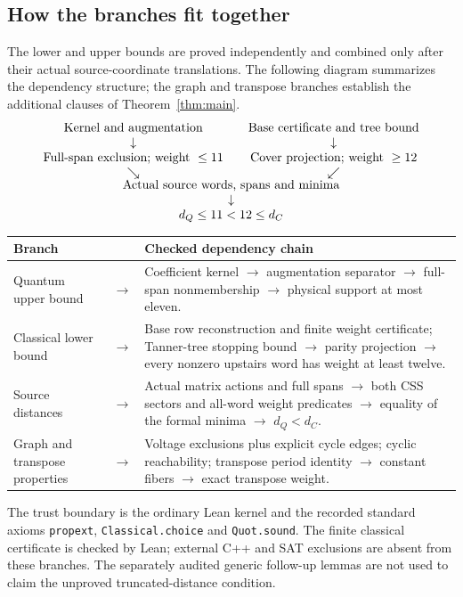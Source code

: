 \subsection{How the branches fit together}
The lower and upper bounds are proved independently and combined only after
their actual source-coordinate translations. The following diagram summarizes
the dependency structure; the graph and transpose branches establish the
additional clauses of Theorem~\ref{thm:main}.
\[
\begin{array}{ccc}
\text{Kernel and augmentation}&&\text{Base certificate and tree bound}\\
\downarrow&&\downarrow\\
\text{Full-span exclusion; weight }\leq11&&\text{Cover projection; weight }\geq12\\
\searrow&&\swarrow\\[-2pt]
\multicolumn{3}{c}{\text{Actual source words, spans and minima}}\\
\multicolumn{3}{c}{\downarrow}\\
\multicolumn{3}{c}{d_Q\leq11<12\leq d_C}
\end{array}
\]
\begin{center}\small
\begin{tabular}{@{}P{.30\textwidth}cP{.57\textwidth}@{}}
\toprule Branch&&Checked dependency chain\\\midrule
Quantum upper bound&$\longrightarrow$&
Coefficient kernel $\to$ augmentation separator $\to$ full-span nonmembership
$\to$ physical support at most eleven.\\[4pt]
Classical lower bound&$\longrightarrow$&
Base row reconstruction and finite weight certificate; Tanner-tree stopping bound
$\to$ parity projection $\to$ every nonzero upstairs word has weight at least twelve.\\[4pt]
Source distances&$\longrightarrow$&
Actual matrix actions and full spans $\to$ both CSS sectors and all-word weight
predicates $\to$ equality of the formal minima $\to$ $d_Q<d_C$.\\[4pt]
Graph and transpose properties&$\longrightarrow$&
Voltage exclusions plus explicit cycle edges; cyclic reachability;
transpose period identity $\to$ constant fibers $\to$ exact transpose weight.\\
\bottomrule
\end{tabular}
\end{center}
The trust boundary is the ordinary Lean kernel and the recorded standard axioms
\texttt{propext}, \texttt{Classical.choice} and \texttt{Quot.sound}. The finite
classical certificate is checked by Lean; external C++ and SAT exclusions are
absent from these branches. The separately audited generic follow-up lemmas are
not used to claim the unproved truncated-distance condition.

